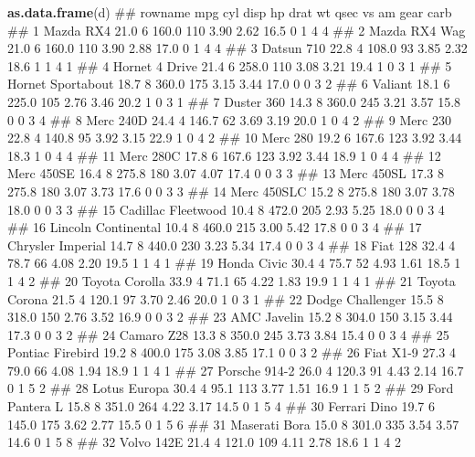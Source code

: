 \documentclass[]{book}
\newenvironment{Shaded}{\begin{snugshade}}{\end{snugshade}}
\newcommand{\KeywordTok}[1]{\textcolor[rgb]{0.13,0.29,0.53}{\textbf{#1}}}
\newcommand{\NormalTok}[1]{#1}
\theoremstyle{definition}
\theoremstyle{definition}
\theoremstyle{definition}
\theoremstyle{remark}
\begin{document}
\begin{Shaded}
\begin{Highlighting}[]
\KeywordTok{as.data.frame}\NormalTok{(d)}
\NormalTok{##                rowname  mpg cyl  disp  hp drat   wt qsec vs am gear carb}
\NormalTok{## 1            Mazda RX4 21.0   6 160.0 110 3.90 2.62 16.5  0  1    4    4}
\NormalTok{## 2        Mazda RX4 Wag 21.0   6 160.0 110 3.90 2.88 17.0  0  1    4    4}
\NormalTok{## 3           Datsun 710 22.8   4 108.0  93 3.85 2.32 18.6  1  1    4    1}
\NormalTok{## 4       Hornet 4 Drive 21.4   6 258.0 110 3.08 3.21 19.4  1  0    3    1}
\NormalTok{## 5    Hornet Sportabout 18.7   8 360.0 175 3.15 3.44 17.0  0  0    3    2}
\NormalTok{## 6              Valiant 18.1   6 225.0 105 2.76 3.46 20.2  1  0    3    1}
\NormalTok{## 7           Duster 360 14.3   8 360.0 245 3.21 3.57 15.8  0  0    3    4}
\NormalTok{## 8            Merc 240D 24.4   4 146.7  62 3.69 3.19 20.0  1  0    4    2}
\NormalTok{## 9             Merc 230 22.8   4 140.8  95 3.92 3.15 22.9  1  0    4    2}
\NormalTok{## 10            Merc 280 19.2   6 167.6 123 3.92 3.44 18.3  1  0    4    4}
\NormalTok{## 11           Merc 280C 17.8   6 167.6 123 3.92 3.44 18.9  1  0    4    4}
\NormalTok{## 12          Merc 450SE 16.4   8 275.8 180 3.07 4.07 17.4  0  0    3    3}
\NormalTok{## 13          Merc 450SL 17.3   8 275.8 180 3.07 3.73 17.6  0  0    3    3}
\NormalTok{## 14         Merc 450SLC 15.2   8 275.8 180 3.07 3.78 18.0  0  0    3    3}
\NormalTok{## 15  Cadillac Fleetwood 10.4   8 472.0 205 2.93 5.25 18.0  0  0    3    4}
\NormalTok{## 16 Lincoln Continental 10.4   8 460.0 215 3.00 5.42 17.8  0  0    3    4}
\NormalTok{## 17   Chrysler Imperial 14.7   8 440.0 230 3.23 5.34 17.4  0  0    3    4}
\NormalTok{## 18            Fiat 128 32.4   4  78.7  66 4.08 2.20 19.5  1  1    4    1}
\NormalTok{## 19         Honda Civic 30.4   4  75.7  52 4.93 1.61 18.5  1  1    4    2}
\NormalTok{## 20      Toyota Corolla 33.9   4  71.1  65 4.22 1.83 19.9  1  1    4    1}
\NormalTok{## 21       Toyota Corona 21.5   4 120.1  97 3.70 2.46 20.0  1  0    3    1}
\NormalTok{## 22    Dodge Challenger 15.5   8 318.0 150 2.76 3.52 16.9  0  0    3    2}
\NormalTok{## 23         AMC Javelin 15.2   8 304.0 150 3.15 3.44 17.3  0  0    3    2}
\NormalTok{## 24          Camaro Z28 13.3   8 350.0 245 3.73 3.84 15.4  0  0    3    4}
\NormalTok{## 25    Pontiac Firebird 19.2   8 400.0 175 3.08 3.85 17.1  0  0    3    2}
\NormalTok{## 26           Fiat X1-9 27.3   4  79.0  66 4.08 1.94 18.9  1  1    4    1}
\NormalTok{## 27       Porsche 914-2 26.0   4 120.3  91 4.43 2.14 16.7  0  1    5    2}
\NormalTok{## 28        Lotus Europa 30.4   4  95.1 113 3.77 1.51 16.9  1  1    5    2}
\NormalTok{## 29      Ford Pantera L 15.8   8 351.0 264 4.22 3.17 14.5  0  1    5    4}
\NormalTok{## 30        Ferrari Dino 19.7   6 145.0 175 3.62 2.77 15.5  0  1    5    6}
\NormalTok{## 31       Maserati Bora 15.0   8 301.0 335 3.54 3.57 14.6  0  1    5    8}
\NormalTok{## 32          Volvo 142E 21.4   4 121.0 109 4.11 2.78 18.6  1  1    4    2}
\end{Highlighting}
\end{Shaded}
\end{document}
